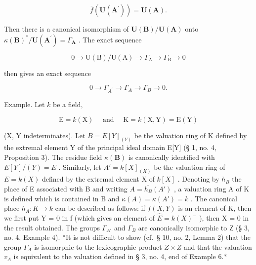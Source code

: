 \[
\overline {{f}} (\mathbf {U} (\mathbf {A} ^ {\prime})) = \mathbf {U} (\mathbf {A}).
\]

Then there is a canonical isomorphism of \(\mathbf{U}(\mathbf{B}) / \mathbf{U}(\mathbf{A})\) onto \(\kappa (\mathbf{B})^{*} / \mathbf{U}(\mathbf{A}^{\prime}) = \Gamma_{\mathbf{A}}\) . The exact sequence

\[
0 \rightarrow \mathrm{U(B)} / \mathrm{U(A)} \rightarrow \Gamma_ {\mathrm{A}} \rightarrow \Gamma_ {\mathrm{B}} \rightarrow 0
\]

then gives an exact sequence

\[
0 \rightarrow \Gamma_ {A ^ {\prime}} \rightarrow \Gamma_ {A} \rightarrow \Gamma_ {B} \rightarrow 0.
\]

Example. Let \(k\) be a field,

\[
\mathrm{E} = k (\mathrm{X}) \quad \text { and } \quad \mathrm{K} = k (\mathrm{X}, \mathrm{Y}) = \mathrm{E} (\mathrm{Y})
\]

(X, Y indeterminates). Let \(B = E[Y]_{(Y)}\) be the valuation ring of K defined by the extremal element Y of the principal ideal domain E{[}Y{]} (§ 1, no. 4, Proposition 3). The residue field \(\kappa(\mathbf{B})\) is canonically identified with \(E[Y]/(Y) = E\) . Similarly, let \(A' = k[X]_{(X)}\) be the valuation ring of \(E = k(X)\) defined by the extremal element X of \(k[X]\) . Denoting by \(h_{B}\) the place of E associated with B and writing \(A = \overline{h_{B}}(A')\) , a valuation ring A of K is defined which is contained in B and \(\kappa(A) = \kappa(A') = k\) . The canonical place \(h_{A}: K \to k\) can be described as follows: if \(f(X, Y)\) is an element of K, then we first put Y = 0 in f (which gives an element of \(\hat{E} = k(X)^{-}\) ), then X = 0 in the result obtained. The groups \(\Gamma_{A'}\) and \(\Gamma_{B}\) are canonically isomorphic to Z (§ 3, no. 4, Example 4). *It is not difficult to show (cf.~§ 10, no. 2, Lemma 2) that the group \(\Gamma_{A}\) is isomorphic to the lexicographic product \(Z \times Z\) and that the valuation \(v_{A}\) is equivalent to the valuation defined in § 3, no. 4, end of Example 6.*

